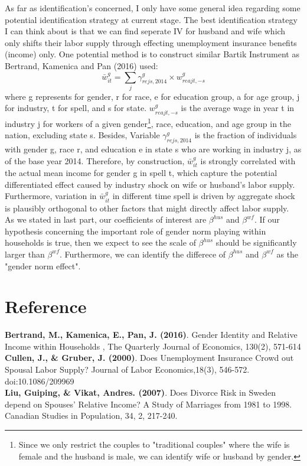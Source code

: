 \documentclass[legalpaper,12pt,margin=1in]{article}
\begin{document}
As far as identification's concerned, I only have some general idea regarding some potential identification strategy at current stage. The best identification strategy I can think about is that we can find seperate IV for husband and wife which only shifts their labor supply through effecting unemployment insurance benefits (income) only. One potential method is to construct similar Bartik Instrument as Bertrand, Kamenica and Pan (2016) used:
\begin{equation}
  \bar{w}^{g}_{it} = \sum_j \gamma^g_{rejs,2014} \times w^g_{reajt,-s}
\end{equation}
where g represents for gender, r for race, e for education group, a for age group, j for industry, t for spell, and s for state. $w^g_{reajt,-s}$ is the average wage in year t in industry j for workers of a given gender\footnote{Since we only restrict the couples to "traditional couples" where the wife is female and the husband is male, we can identify wife or husband by gender. }, race, education, and age group in the nation, excluding state s. Besides, Variable $\gamma^g_{rejs,2014}$ is the fraction of individuals with gender g, race r, and education e in state s who are working in industry j, as of the base year 2014. Therefore, by construction, $\bar{w}^{g}_{it}$ is strongly correlated with the actual mean income for gender g in spell t, which capture the potential differentiated effect caused by industry shock on wife or husband's labor supply. Furthermore, variation in $\bar{w}^{g}_{it}$ in different time spell is driven by aggregate shock is plausibly orthogonal to other factors that might directly affect labor supply.\\
As we stated in last part, our coefficients of interest are $\beta^{hus}$ and $\beta^{wf}$. If our hypothesis concerning the important role of gender norm playing within households is true, then we expect to see the scale of $\beta^{hus}$ should be significantly larger than $\beta^{wf}$. Furthermore, we can identify the differece of $\beta^{hus}$ and $\beta^{wf}$ as the "gender norm effect".
\section{Reference}
\textbf{Bertrand, M., Kamenica, E., Pan, J. (2016)}.  Gender Identity and Relative Income within Households , The Quarterly Journal of Economics, 130(2), 571-614  \\
\textbf{Cullen, J., & Gruber, J. (2000)}. Does Unemployment Insurance Crowd out Spousal Labor Supply? Journal of Labor Economics,18(3), 546-572. doi:10.1086/209969 \\
\textbf{Liu, Guiping, & Vikat, Andres. (2007)}.  Does Divorce Risk in Sweden depend on Spouses' Relative Income? A Study of Marriages from 1981 to 1998. Canadian Studies in Population, 34, 2, 217-240. \\
\end{document}
